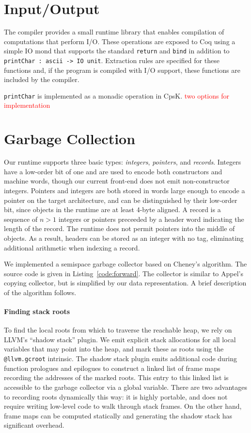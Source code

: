 \documentclass{article}
\newcommand{\todo}[1]{\textcolor{red}{#1}}
\begin{document}
\section{Input/Output}
\label{sec:io}

The compiler provides a small runtime library that enables compilation of computations that perform I/O. These operations are exposed to Coq using a simple IO mond that supports the standard \lstinline!return! and \lstinline!bind! in addition to \lstinline!printChar : ascii -> IO unit!. Extraction rules are specified for these functions and, if the program is compiled with I/O support, these functions are included by the compiler.

\lstinline!printChar! is implemented as a monadic operation in CpsK. \todo{two options for implementation}


\section{Garbage Collection}
\label{sec:gc}

Our runtime supports three basic types: \emph{integers}, \emph{pointers}, and \emph{records}. Integers have a low-order bit of one and are used to encode both constructors and machine words, though our current front-end does not emit non-constructor integers. Pointers and integers are both stored in words large enough to encode a pointer on the target architecture, and can be distinguished by their low-order bit, since objects in the runtime are at least 4-byte aligned. A record is a sequence of $n > 1$ integers or pointers preceeded by a header word indicating the length of the record. The runtime does not permit pointers into the middle of objects. As a result, headers can be stored as an integer with no tag, eliminating additional arithmetic when indexing a record.

We implemented a semispace garbage collector based on Cheney's algorithm. The source code is given in Listing~\ref{code:forward}. The collector is similar to Appel's copying collector, but is simplified by our data representation. A brief description of the algorithm follows.

\paragraph{Finding stack roots} To find the local roots from which to traverse the reachable heap, we rely on LLVM's ``shadow stack'' plugin. We emit explicit stack allocations for all local variables that may point into the heap, and mark these as roots using the \lstinline!@llvm.gcroot! intrinsic. The shadow stack plugin emits additional code during function prologues and epilogues to construct a linked list of frame maps recording the addresses of the marked roots. This entry to this linked list is accessible to the garbage collector via a global variable. There are two advantages to recording roots dynamically this way: it is highly portable, and does not require writing low-level code to walk through stack frames. On the other hand, frame maps can be computed statically and generating the shadow stack has significant overhead.
\end{document}
